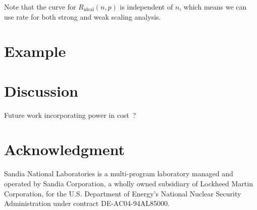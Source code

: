 \documentclass[conference]{IEEEtran}
\newcommand*{\lcite}[1]{~\cite{#1}}
\begin{document}
Note that the curve for $R_\mathrm{ideal}(n,p)$ is independent of $n$,
which means we can use rate for both strong and weak scaling analysis.


\section{Example}


\section{Discussion}

Future work incorporating power in cost\lcite{Cameron2012}?


\section*{Acknowledgment}

\noindent
Sandia National Laboratories is a multi-program laboratory managed and
operated by Sandia Corporation, a wholly owned subsidiary of Lockheed
Martin Corporation, for the U.S. Department of Energy's National Nuclear
Security Administration under contract DE-AC04-94AL85000.



\end{document}
